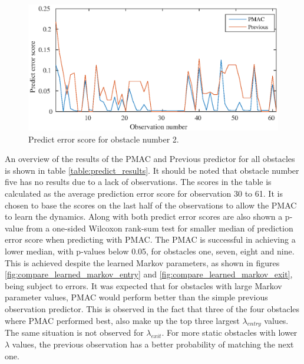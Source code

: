 \begin{figure}[htbp]
	\centering
	\includegraphics[scale=1]{chapters/evaluation/figures/markov_predict_figs/obstacle2_low.eps}
	\caption{Predict error score for obstacle number 2.}
	\label{fig:markov_predict_obst_2}
\end{figure}%

An overview of the results of the PMAC and Previous predictor for all obstacles is shown in table \ref{table:predict_results}. It should be noted that obstacle number five has no results due to a lack of observations. 
The scores in the table is calculated as the average prediction error score for observation 30 to 61.
It is chosen to base the scores on the last half of the observations to allow the PMAC to learn the dynamics. 
Along with both predict error scores are also shown a p-value from a one-sided Wilcoxon rank-sum test for smaller median of prediction error score when predicting with PMAC. 
The PMAC is successful in achieving a lower median, with p-values below 0.05, for obstacles one, seven, eight and nine. 
This is achieved despite the learned Markov parameters, as shown in figures \ref{fig:compare_learned_markov_entry} and  \ref{fig:compare_learned_markov_exit}, being subject to errors. 
It was expected that for obstacles with large Markov parameter values, PMAC would perform better than the simple previous observation predictor. 
This is observed in the fact that three of the four obstacles where PMAC performed best, also make up the top three largest \(\lambda_{entry}\) values. 
The same situation is not observed for \(\lambda_{exit}\). 
For more static obstacles with lower \(\lambda\) values, the previous observation has a better probability of matching the next one.

